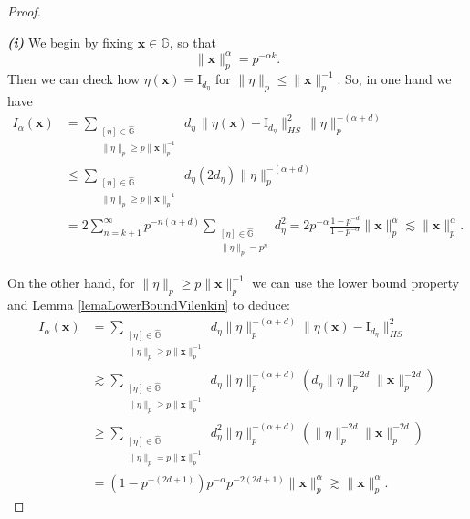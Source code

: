 \documentclass[12pt, reqno]{amsart}
\newcommand{\1}{\mathds{1}}
\begin{document}
 \begin{proof}
\,
 
\textit{\textbf{(i)}} We begin by fixing $\mathbf{x} \in \mathbb{G}$, so that 
\[
\|\mathbf{x}\|_{p}^\alpha = p^{-\alpha k}.
\] 
Then we can check how $\eta (\mathbf{x}) = \mathrm{I}_{d_\eta}$ for $\|\eta \|_p \leq \|\mathbf{x}\|^{-1}_p$.  
So, in one hand we have
\begin{align*}
I_\alpha(\mathbf{x}) 
&= \sum_{\substack{[\eta] \in \widehat{\mathbb{G}} \\ \|\eta\|_p \geq p \|\mathbf{x}\|^{-1}_p}}
d_\eta \, \|\eta(\mathbf{x}) - \mathrm{I}_{d_\eta} \|^2_{HS} \, \|\eta\|_p^{-(\alpha+d)} \\
&\leq \sum_{\substack{[\eta] \in \widehat{\mathbb{G}} \\ \|\eta\|_p \geq p \|\mathbf{x}\|^{-1}_p}}
d_\eta (2d_\eta ) \|\eta\|_p^{-(\alpha+d)} \\
&= 2 \sum_{n=k+1}^\infty 
p^{-n(\alpha+d)}
\sum_{\substack{[\eta] \in \widehat{\mathbb{G}} \\ \|\eta\|_p = p^n}} 
d_\eta^2 = 2 p^{-\alpha} \frac{
1 - p^{-d}}{1-p^{- \alpha}} \|\mathbf{x}\|^\alpha_p \lesssim \|\mathbf{x}\|^\alpha_p.
\end{align*}

On the other hand, for $\|\eta\|_p \geq p \|\mathbf{x}\|_p^{-1}$ we can use the lower bound property and Lemma \ref{lemaLowerBoundVilenkin} to deduce:
\begin{align*}
I_\alpha(\mathbf{x}) 
&= \sum_{\substack{[\eta] \in \widehat{\mathbb{G}} \\ \|\eta \|_p \geq p \|\mathbf{x}\|_p^{-1}}}
d_\eta \|\eta\|_p^{-(\alpha+d)} \|\eta(\mathbf{x}) - \mathrm{I}_{ d_\eta}\|_{HS}^2   \\
&\gtrsim \sum_{\substack{ [\eta] \in \widehat{\mathbb{G}} \\ \| \eta \|_p \geq p \|\mathbf{x}\|_p^{-1}}}
d_\eta \|\eta \|_p^{-(\alpha+d)} \left( d_\eta \| \eta \|_p^{-2d} \|\mathbf{x}\|_p^{-2d}  \right)  \\
&\geq \sum_{\substack{ [\eta] \in \widehat{\mathbb{G}} \\ \|\eta\|_p = p \|\mathbf{x}\|_p^{-1}}}
d_\eta^2 \|\eta\|_p^{-(\alpha+d)}  \left( \|\eta\|_p^{-2d} \|\mathbf{x}\|_p^{-2d} \right) \\
&= (1 - p^{-(2d+1)}) p^{-\alpha} p^{-2(2d+1)} \|\mathbf{x}\|^\alpha_p \gtrsim \| \mathbf{x} \|_p^\alpha.
\end{align*}

\medskip


\end{proof}
\end{document}
